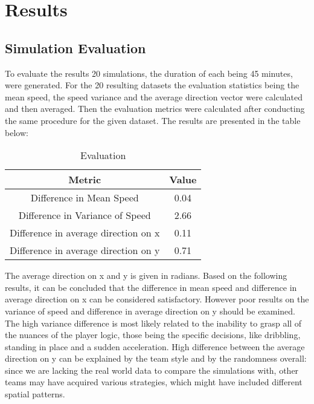 \chapter{Results}
\section{Simulation Evaluation}
To evaluate the results 20 simulations, the duration of each being 45 minutes, were generated. For the 20 resulting datasets the evaluation statistics being the mean speed, the speed variance and the average direction vector were calculated and then averaged. Then the evaluation metrics were calculated after conducting the same procedure for the given dataset. The results are presented in the table below:
\begin{table}[!ht]
    \centering
    \begin{tabular}{c|c}
        \hline
        \textbf{Metric} & \textbf{Value} \\
        \hline
        Difference in Mean Speed &  0.04\\
        Difference in Variance of Speed & 2.66 \\
        Difference in average direction on x & 0.11\\
        Difference in average direction on y & 0.71
    \end{tabular}
    \caption{Evaluation}
    \label{tab:sim_eval}
\end{table}

The average direction on x and y is given in radians. Based on the following results, it can be concluded that the difference in mean speed and difference in average direction on x can be considered satisfactory. However poor results on the variance of speed and difference in average direction on y should be examined. The high variance difference is most likely related to the inability to grasp all of the nuances of the player logic, those being the specific decisions, like dribbling, standing in place and a sudden acceleration. High difference between the average direction on y can be explained by the team style and by the randomness overall: since we are lacking the real world data to compare the simulations with, other teams may have acquired various strategies, which might have included different spatial patterns. 



